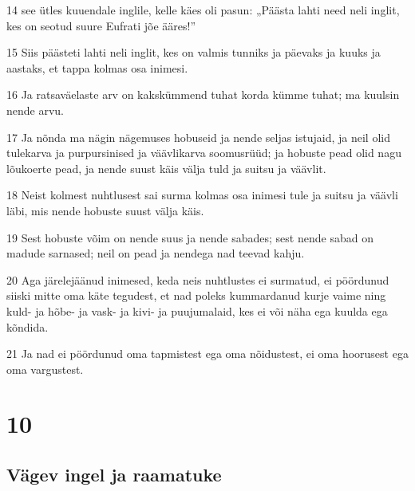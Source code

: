 \par 14 see ütles kuuendale inglile, kelle käes oli pasun: „Päästa lahti need neli inglit, kes on seotud suure Eufrati jõe ääres!”
\par 15 Siis päästeti lahti neli inglit, kes on valmis tunniks ja päevaks ja kuuks ja aastaks, et tappa kolmas osa inimesi.
\par 16 Ja ratsaväelaste arv on kakskümmend tuhat korda kümme tuhat; ma kuulsin nende arvu.
\par 17 Ja nõnda ma nägin nägemuses hobuseid ja nende seljas istujaid, ja neil olid tulekarva ja purpursinised ja väävlikarva soomusrüüd; ja hobuste pead olid nagu lõukoerte pead, ja nende suust käis välja tuld ja suitsu ja väävlit.
\par 18 Neist kolmest nuhtlusest sai surma kolmas osa inimesi tule ja suitsu ja väävli läbi, mis nende hobuste suust välja käis.
\par 19 Sest hobuste võim on nende suus ja nende sabades; sest nende sabad on madude sarnased; neil on pead ja nendega nad teevad kahju.
\par 20 Aga järelejäänud inimesed, keda neis nuhtlustes ei surmatud, ei pöördunud siiski mitte oma käte tegudest, et nad poleks kummardanud kurje vaime ning kuld- ja hõbe- ja vask- ja kivi- ja puujumalaid, kes ei või näha ega kuulda ega kõndida.
\par 21 Ja nad ei pöördunud oma tapmistest ega oma nõidustest, ei oma hoorusest ega oma vargustest.



\chapter{10}

\section*{Vägev ingel ja raamatuke}

